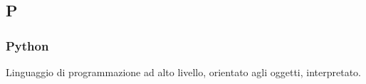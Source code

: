 \subsection*{\textbf{\hfill \Huge{P} \hfill}} 
\subsubsection*{Python}
Linguaggio di programmazione ad alto livello, orientato agli oggetti, interpretato.
